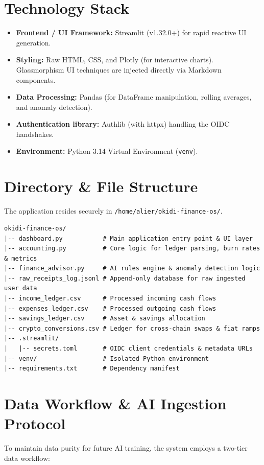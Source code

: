 \documentclass[12pt,a4paper]{article}
\begin{document}
\section{Technology Stack}
\begin{itemize}
    \item \textbf{Frontend / UI Framework:} Streamlit (v1.32.0+) for rapid reactive UI generation.
    \item \textbf{Styling:} Raw HTML, CSS, and Plotly (for interactive charts). Glassmorphism UI techniques are injected directly via Markdown components.
    \item \textbf{Data Processing:} Pandas (for DataFrame manipulation, rolling averages, and anomaly detection).
    \item \textbf{Authentication library:} Authlib (with httpx) handling the OIDC handshakes.
    \item \textbf{Environment:} Python 3.14 Virtual Environment (\texttt{venv}).
\end{itemize}

\section{Directory \& File Structure}
The application resides securely in \texttt{/home/alier/okidi-finance-os/}.
\begin{verbatim}
okidi-finance-os/
|-- dashboard.py           # Main application entry point & UI layer
|-- accounting.py          # Core logic for ledger parsing, burn rates & metrics
|-- finance_advisor.py     # AI rules engine & anomaly detection logic
|-- raw_receipts_log.jsonl # Append-only database for raw ingested user data
|-- income_ledger.csv      # Processed incoming cash flows
|-- expenses_ledger.csv    # Processed outgoing cash flows
|-- savings_ledger.csv     # Asset & savings allocation
|-- crypto_conversions.csv # Ledger for cross-chain swaps & fiat ramps
|-- .streamlit/
|   |-- secrets.toml       # OIDC client credentials & metadata URLs
|-- venv/                  # Isolated Python environment
|-- requirements.txt       # Dependency manifest
\end{verbatim}

\section{Data Workflow \& AI Ingestion Protocol}
To maintain data purity for future AI training, the system employs a two-tier data workflow:
\end{document}
